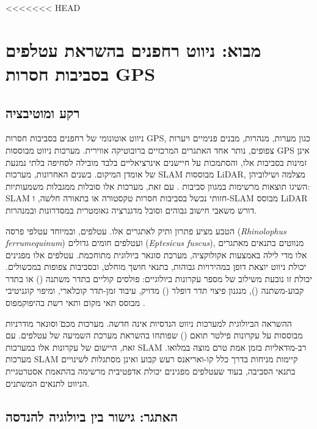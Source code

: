 <<<<<<< HEAD


\section{מבוא: ניווט רחפנים בהשראת עטלפים בסביבות חסרות GPS}
\label{sec:ch01_introduction}

\subsection{רקע ומוטיבציה}
\label{sec:ch01_background}

ניווט אוטונומי של רחפנים בסביבות חסרות GPS, כגון מערות, מנהרות, מבנים פנימיים ויערות צפופים, נותר אחד האתגרים המרכזיים ברובוטיקה אווירית. מערכות ניווט מבוססות GPS אינן זמינות בסביבות אלו, והסתמכות על חיישנים אינרציאליים בלבד מובילה לסחיפה בלתי נמנעת של אומדן המיקום. בשנים האחרונות, מערכות SLAM מבוססות LiDAR, מצלמה ושילוביהן השיגו תוצאות מרשימות במגוון סביבות \cite{Campos2021ORBSLAM3, Xu2022FASTLIO2}. עם זאת, מערכות אלו סובלות ממגבלות משמעותיות: SLAM חזותי נכשל בסביבות חסרות טקסטורה או בתאורה חלשה, ו-SLAM מבוסס LiDAR דורש משאבי חישוב גבוהים וסובל מדגנרציה גאומטרית במסדרונות ובמנהרות.

הטבע מציע פתרון ותיק לאתגרים אלו. עטלפים, ובמיוחד עטלפי פרסה (\textit{Rhinolophus ferrumequinum}) ועטלפים חומים גדולים (\textit{Eptesicus fuscus}), מנווטים בתנאים מאתגרים אלו מדי לילה באמצעות אקולוקציה, מערכת סונאר ביולוגית מתוחכמת. עטלפים אלו מפגינים יכולת ניווט יוצאת דופן במהירויות גבוהות, בתנאי חושך מוחלט, ובסביבות צפופות במכשולים. יכולת זו נובעת משילוב של מספר עקרונות ביולוגיים: פולסים קוליים בתדר משתנה () או בתדר קבוע-משתנה (), מנגנון פיצוי תדר דופלר () מדויק, עיבוד זמן-תדר קוכלארי, ומיפוי קוגניטיבי מבוסס תאי מקום ותאי רשת בהיפוקמפוס \cite{Schnitzler1968DSC, Schuller1974DSC, Simmons1979BatSonar}.

ההשראה הביולוגית למערכות ניווט הנדסיות אינה חדשה. מערכות מכ\"ם וסונאר מודרניות מבוססות על עקרונות פילטר תואם () שפותחו בהשראת מערכת השמיעה של עטלפים. עם זאת, היישום של עקרונות אלו במערכות SLAM רב-מודאליות בזמן אמת טרם מוצה במלואו. מערכות SLAM קיימות מניחות בדרך כלל קו-ואריאנס רעש קבוע ואינן מסתגלות לשינויים בתנאי הסביבה, בעוד שעטלפים מפגינים יכולת אדפטיבית מרשימה בהתאמת אסטרטגיית הניווט לתנאים המשתנים.

\subsection{האתגר: גישור בין ביולוגיה להנדסה}
\label{sec:ch01_challenge}

